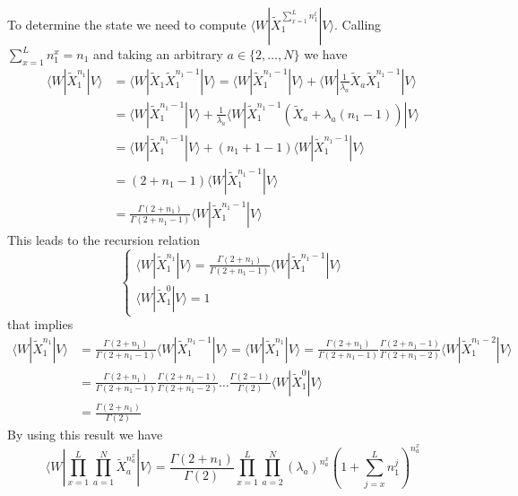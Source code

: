\documentclass[11pt]{article}
\numberwithin{equation}{section}
\numberwithin{equation}{subsection}
\begin{document}
To determine the state we need to compute $\langle W|\widetilde{X}_{1}^{\sum_{x=1}^{L}n_{1}^{l}}|V\rangle$. Calling $\sum_{x=1}^{L}n_{1}^{x}=n_{1}$ and taking an arbitrary $a\in \{2,\ldots,N\}$ we have
\begin{align*}
	\langle W|\widetilde{X}_{1}^{n_{1}}|V\rangle&=\langle W|\widetilde{X}_{1}\widetilde{X}_{1}^{n_{1}-1}|V\rangle=\langle W|\widetilde{X}_{1}^{n_{1}-1}|V\rangle +\langle W|\frac{1}{\lambda_{a}}\widetilde{X}_{a}\widetilde{X}_{1}^{n_{1}-1}|V\rangle
	\\&=
	\langle W|\widetilde{X}_{1}^{n_{1}-1}|V\rangle+\frac{1}{\lambda_{a}}\langle W|\widetilde{X}_{1}^{n_{1}-1}\left(\widetilde{X}_{a}+\lambda_{a}(n_{1}-1)\right)|V\rangle
	\\&=
	\langle W|\widetilde{X}_{1}^{n_{1}-1}|V\rangle+\left(n_{1}+1-1\right)\langle W|\widetilde{X}_{1}^{n_{1}-1}|V\rangle
	\\&=
	\left(2+n_{1}-1\right)\langle W|\widetilde{X}_{1}^{n_{1}-1}|V\rangle
	\\&=
	\frac{\Gamma(2+n_{1})}{\Gamma(2+n_{1}-1)}\langle W|\widetilde{X}_{1}^{n_{1}-1}|V\rangle
\end{align*}
This leads to the recursion relation
\begin{equation}
	\begin{cases}
		\langle W|\widetilde{X}_{1}^{n_{1}}|V\rangle=\frac{\Gamma(2+n_{1})}{\Gamma(2+n_{1}-1)}\langle W|\widetilde{X}_{1}^{n_{1}-1}|V\rangle\\
		\langle W|\widetilde{X}_{1}^{0}|V\rangle=1
	\end{cases}
\end{equation}
that implies 
\begin{align*}
	\langle W|\widetilde{X}_{1}^{n_{1}}|V\rangle&=\frac{\Gamma(2+n_{1})}{\Gamma(2+n_{1}-1)}\langle W|\widetilde{X}_{1}^{n_{1}-1}|V\rangle=\langle W|\widetilde{X}_{1}^{n_{1}}|V\rangle=\frac{\Gamma(2+n_{1})}{\Gamma(2+n_{1}-1)}\frac{\Gamma(2+n_{1}-1)}{\Gamma(2+n_{1}-2)}\langle W|\widetilde{X}_{1}^{n_{1}-2}|V\rangle\\&=
	\frac{\Gamma(2+n_{1})}{\Gamma(2+n_{1}-1)}\frac{\Gamma(2+n_{1}-1)}{\Gamma(2+n_{1}-2)}\ldots \frac{\Gamma(2-1)}{\Gamma(2)}\langle W|\widetilde{X}_{1}^{0}|V\rangle
	\\&=
	\frac{\Gamma(2+n_{1})}{\Gamma(2)}
\end{align*}
By using this result we have 
\begin{equation}
	\langle W|\prod_{x=1}^{L}\prod_{a=1}^{N}\widetilde{X}_{a}^{n_{a}^{x}}
	|V \rangle=\frac{\Gamma(2+n_{1})}{\Gamma(2)}\prod_{x=1}^{L}\prod_{a=2}^{N}\left(\lambda_{a}\right)^{n_{a}^{x}}\left(1+\sum_{j=x}^{L}n_{1}^{j}\right)^{n_{a}^{x}}
\end{equation}
\end{document}
